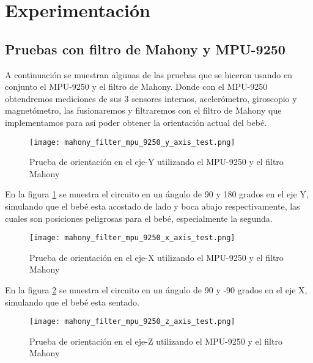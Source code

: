 



\section{Experimentación}
    \subsection{Pruebas con filtro de Mahony y MPU-9250}
       A continuación se muestran algunas de las pruebas que se hiceron usando en conjunto el 
       MPU-9250 y el filtro de Mahony. Donde con el MPU-9250 obtendremos mediciones de sus 3 sensores internos, acelerómetro, 
       giroscopio y magnetómetro, las fusionaremos y filtraremos con el filtro de Mahony que 
       implementamos para así poder obtener la orientación actual del bebé.

       \begin{figure}[htp!]
        \centering
             \texttt{[image: mahony\_filter\_mpu\_9250\_y\_axis\_test.png]}
              \caption{Prueba de orientación en el eje-Y utilizando el MPU-9250 y el filtro Mahony}
              \label{fig: test-y}
        \end{figure}
        \FloatBarrier 

        En la figura \ref{fig: test-y} se muestra el circuito en un ángulo de 90 y 180 grados en el eje Y, simulando que el bebé
        esta acostado de lado y boca abajo respectivamente, las cuales son posiciones peligrosas para el bebé, especialmente
        la segunda.

        \begin{figure}[htp!]
        \centering
            \texttt{[image: mahony\_filter\_mpu\_9250\_x\_axis\_test.png]}
            \caption{Prueba de orientación en el eje-X utilizando el MPU-9250 y el filtro Mahony}
            \label{fig: test-x}
        \end{figure}
        \FloatBarrier 
    
        En la figura \ref{fig: test-x} se muestra el circuito en un ángulo de 90 y -90 grados en el eje X, simulando que el bebé
        esta sentado.

        \begin{figure}[htp!]
        \centering
            \texttt{[image: mahony\_filter\_mpu\_9250\_z\_axis\_test.png]}
            \caption{Prueba de orientación en el eje-Z utilizando el MPU-9250 y el filtro Mahony}
            \label{fig: test-z}
        \end{figure}
        \FloatBarrier 

